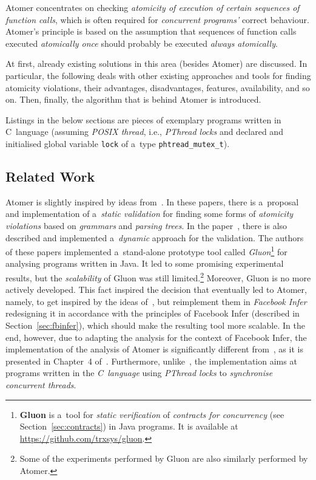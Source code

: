 Atomer concentrates on checking \emph{atomicity of execution of certain
sequences of function calls}, which is often required for \emph{concurrent
programs'} correct behaviour. Atomer's principle is based on the assumption
that sequences of function calls executed \emph{atomically once}
should probably be executed \emph{always atomically}.

At first, already existing solutions in this area (besides Atomer) are
discussed. In particular, the following deals with other existing
approaches and tools for finding atomicity violations, their advantages,
disadvantages, features, availability, and so on. Then, finally, the
algorithm that is behind Atomer is introduced.

Listings in the below sections are pieces of exemplary programs written
in C~language (assuming \emph{POSIX thread}, i.e., \emph{PThread locks}
and declared and initialised global variable \texttt{lock} of a~type
\texttt{phtread\_mutex\_t}).

\subsection{Related Work}

Atomer is slightly inspired by ideas from~\cite{contracts2017, contracts2015}.
In these papers, there is a~proposal and implementation of a~\emph{static
validation} for finding some forms of \emph{atomicity violations} based on
\emph{grammars} and \emph{parsing trees}. In the paper~\cite{contracts2017},
there is also described and implemented a~\emph{dynamic} approach for the
validation. The authors of these papers implemented a~stand-alone prototype
tool called \emph{Gluon}\footnote{\textbf{Gluon} is a~tool for \emph{static
verification} of \emph{contracts for concurrency}
(see Section~\ref{sec:contracts}) in Java programs. It is available at
\url{https://github.com/trxsys/gluon}.} for analysing programs written in Java.
It led to some promising experimental results, but the \emph{scalability} of
Gluon was still limited.\footnote{Some of the experiments performed by Gluon
are also similarly performed by Atomer.} Moreover, Gluon is no more
actively developed. This fact inspired the decision that eventually led to
Atomer, namely, to get inspired by the ideas of~\cite{contracts2017,
contracts2015}, but reimplement them in \emph{Facebook Infer} redesigning it
in accordance with the principles of Facebook Infer (described in
Section~\ref{sec:fbinfer}), which should make the resulting tool more
scalable. In the end, however, due to adapting the analysis for the context
of Facebook Infer, the implementation of the analysis of Atomer is
significantly different from~\cite{contracts2017, contracts2015}, as it is
presented in Chapter~4 of~\cite{harmimBP}. Furthermore,
unlike~\cite{contracts2017, contracts2015}, the implementation aims at
programs written in the \emph{C~language} using \emph{PThread locks} to
\emph{synchronise concurrent threads}.

